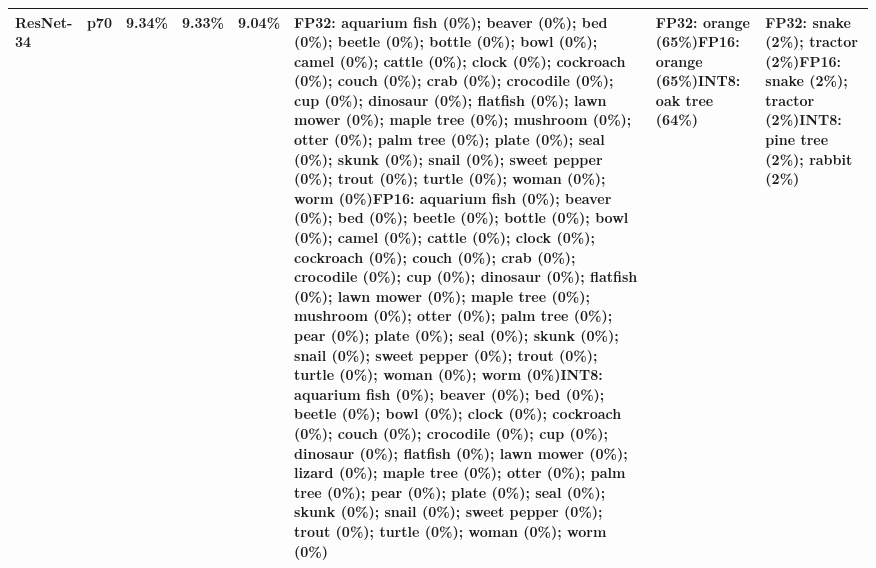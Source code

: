 \begin{longtable}{p{2.8cm} r r r r p{5.0cm} p{4.2cm} p{4.2cm}}
ResNet-34 & p70 & 9.34\% & 9.33\% & 9.04\% & FP32: aquarium fish (0\%); beaver (0\%); bed (0\%); beetle (0\%); bottle (0\%); bowl (0\%); camel (0\%); cattle (0\%); clock (0\%); cockroach (0\%); couch (0\%); crab (0\%); crocodile (0\%); cup (0\%); dinosaur (0\%); flatfish (0\%); lawn mower (0\%); maple tree (0\%); mushroom (0\%); otter (0\%); palm tree (0\%); plate (0\%); seal (0\%); skunk (0\%); snail (0\%); sweet pepper (0\%); trout (0\%); turtle (0\%); woman (0\%); worm (0\%)\newline FP16: aquarium fish (0\%); beaver (0\%); bed (0\%); beetle (0\%); bottle (0\%); bowl (0\%); camel (0\%); cattle (0\%); clock (0\%); cockroach (0\%); couch (0\%); crab (0\%); crocodile (0\%); cup (0\%); dinosaur (0\%); flatfish (0\%); lawn mower (0\%); maple tree (0\%); mushroom (0\%); otter (0\%); palm tree (0\%); pear (0\%); plate (0\%); seal (0\%); skunk (0\%); snail (0\%); sweet pepper (0\%); trout (0\%); turtle (0\%); woman (0\%); worm (0\%)\newline INT8: aquarium fish (0\%); beaver (0\%); bed (0\%); beetle (0\%); bowl (0\%); clock (0\%); cockroach (0\%); couch (0\%); crocodile (0\%); cup (0\%); dinosaur (0\%); flatfish (0\%); lawn mower (0\%); lizard (0\%); maple tree (0\%); otter (0\%); palm tree (0\%); pear (0\%); plate (0\%); seal (0\%); skunk (0\%); snail (0\%); sweet pepper (0\%); trout (0\%); turtle (0\%); woman (0\%); worm (0\%) & FP32: orange (65\%)\newline FP16: orange (65\%)\newline INT8: oak tree (64\%) & FP32: snake (2\%); tractor (2\%)\newline FP16: snake (2\%); tractor (2\%)\newline INT8: pine tree (2\%); rabbit (2\%) \\ \hline

\end{longtable}
